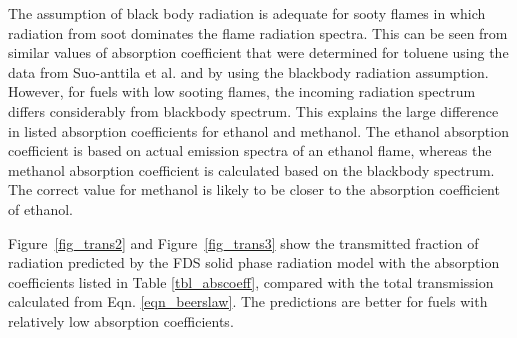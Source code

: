 The assumption of black body radiation is adequate for sooty flames in which radiation from soot dominates the flame radiation spectra. This can be seen from similar values of absorption coefficient that were determined for toluene using the data from Suo-anttila et al. and by using the blackbody radiation assumption. However, for fuels with low sooting flames, the incoming radiation spectrum differs considerably from blackbody spectrum. This explains the large difference in listed absorption coefficients for ethanol and methanol. The ethanol absorption coefficient is based on actual emission spectra of an ethanol flame, whereas the methanol absorption coefficient is calculated based on the blackbody spectrum. The correct value for methanol is likely to be closer to the absorption coefficient of ethanol. 

Figure~\ref{fig_trans2} and Figure~\ref{fig_trans3} show the transmitted fraction of radiation predicted by the FDS solid phase radiation model with the absorption coefficients listed in Table \ref{tbl_abscoeff}, compared with the total transmission calculated from Eqn. \ref{eqn_beerslaw}. The predictions are better for fuels with relatively low absorption coefficients. 

